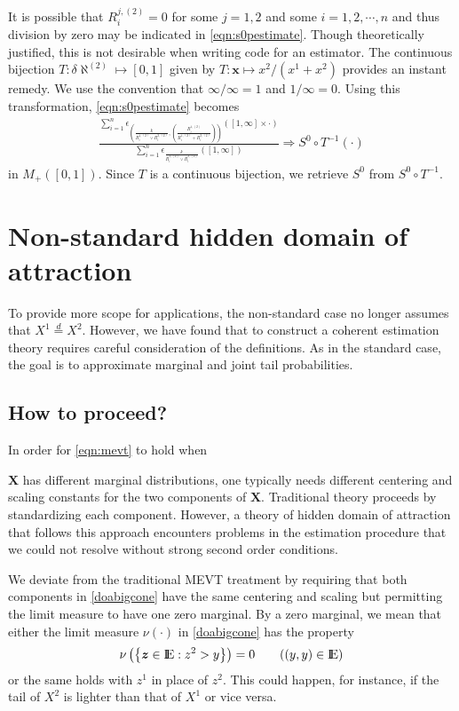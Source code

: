\documentclass[11 pt]{amsart}
\numberwithin{equation}{section}
\begin{document}
{{{It is possible that} $R^{j, (2)}_i {=0}$ for some $j = 1, 2$ and
some $i = 1, 2, \cdots, n$ and thus 
division by zero may be indicated in 
\eqref{eqn:s0pestimate}.
 Though theoretically justified, this is not  desirable
when writing code for an estimator. The continuous
bijection $T: \delta \aleph^{(2)} \mapsto [0,1]$ given by $T: {\boldsymbol x}
\mapsto x^2/(x^1 + x^2)$ provides an instant remedy. We use the
convention that $\infty/\infty = 1$ and $1/\infty = 0$. Using this
transformation, \eqref{eqn:s0pestimate} becomes  
\begin{align}\label{eqn:trs0pestimate}
\frac{ \sum_{i=1}^n \epsilon_{\left(\frac{k}{R^{1, (2)}_i \vee R^{2, (2)}_i} , \left( \frac{R^{1, (2)}_i }{R^{1, (2)}_i + R^{2, (2)}_i} \right) \right)} \left([1, \infty] \times \cdot \right)}{\sum_{i=1}^n \epsilon_{\frac{k}{R^{1, (2)}_i \vee R^{2, (2)}_i} }([1, \infty])} \Rightarrow S^0 \circ T^{-1}(\cdot)
\end{align}
in $M_+([0, 1])$. Since $T$ is a continuous bijection, we  retrieve $S^0$ from 
$S^0 \circ T^{-1}$. 

\section{Non-standard hidden domain of attraction}\label{sec:nonstandard}
{To provide more scope for applications, 
the non-standard case no longer assumes that $X^1
\stackrel{d}{=} X^2$. However, we have found that to construct a
coherent estimation theory requires careful consideration of the
definitions.
As in the standard case, the goal is to approximate
 marginal and
joint tail probabilities.}

\subsection{How to proceed?}\label{subsec:how?}
In order for \eqref{eqn:mevt} to hold when {${\boldsymbol X}$ has different
  marginal distributions, one typically needs
different centering and scaling
constants for the two components of ${\boldsymbol X}$.  Traditional theory  \cite[page
277, Proposition 5.15]{resnickbook:2008} proceeds by standardizing each
component.
However,  a theory of hidden domain of attraction
that follows this approach encounters  problems in the estimation
procedure that we could not  resolve without strong second order
conditions. 

We deviate from the
traditional MEVT treatment by requiring that both
components in \eqref{doabigcone} have
 the same centering and scaling   but permitting the limit
measure to have one  zero marginal. By a zero marginal, we mean
 that either the limit measure 
$\nu(\cdot)$ in
\eqref{doabigcone} has the property
$$\nu\left( \left \{
    {\boldsymbol z} \in {\mathop{\rm I\kern -0.20em E}\nolimits} : z^2 > y \right \} \right) = 0 \qquad ((y,y)
\in {\mathop{\rm I\kern -0.20em E}\nolimits})$$ 
or the same holds with $z^1$ in place of $z^2$.
This could happen, for instance, if the tail of $X^2$ is lighter than
that of $X^1$ or vice versa.}

}}
\end{document}
